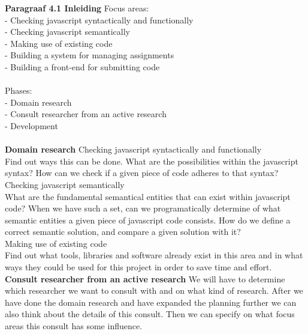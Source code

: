 \documentclass{article}
\begin{document}
\noindent
\textbf{Paragraaf 4.1 Inleiding}
Focus areas:\\
- Checking javascript syntactically and functionally\\
- Checking javascript semantically\\
- Making use of existing code\\
- Building a system for managing assignments\\
- Building a front-end for submitting code\\
\\
Phases:\\
- Domain research\\
- Consult researcher from an active research\\
- Development\\
\\

\noindent
\textbf{Domain research}
\newline
Checking javascript syntactically and functionally\\
Find out ways this can be done. What are the possibilities within the javascript syntax? How can we check if a given piece of code adheres to that syntax?\\
Checking javascript semantically\\
What are the fundamental semantical entities that can exist within javascript code? When we have such a set, can we programatically determine of what semantic entities a given piece of javascript code consists. How do we define a correct semantic solution, and compare a given solution with it?\\
Making use of existing code\\
Find out what tools, libraries and software already exist in this area and in what ways they could be used for this project in order to save time and effort.\\

\noindent
\textbf{Consult researcher from an active research}
\newline
We will have to determine which researcher we want to consult with and on what kind of research. After we have done the domain research and have expanded the planning further we can also think about the details of this consult. Then we can specify on what focus areas this consult has some influence.\\
\newline
\end{document}
